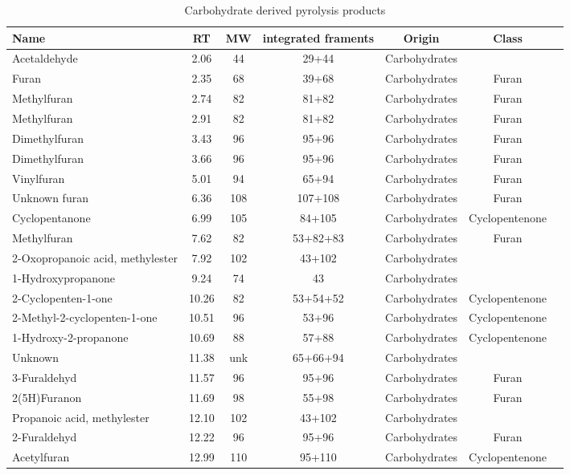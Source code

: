 \begin{table}[h!]
\begin{center}
\caption{Carbohydrate derived pyrolysis products}
\label{tab:chprod}
{\small
\begin{tabular}{lcccccc}
  \hline
Name & RT & MW & integrated framents & Origin & Class \\ 
  \hline
Acetaldehyde & 2.06 & 44 & 29+44 &Carbohydrates&  \\ 
Furan & 2.35 & 68 & 39+68 &Carbohydrates&Furan\\ 
Methylfuran & 2.74 & 82 & 81+82 &Carbohydrates&Furan\\ 
Methylfuran & 2.91 & 82 & 81+82 &Carbohydrates&Furan\\ 
Dimethylfuran & 3.43 & 96 & 95+96 &Carbohydrates&Furan\\ 
Dimethylfuran & 3.66 & 96 & 95+96 &Carbohydrates&Furan\\ 
Vinylfuran & 5.01 & 94 & 65+94 &Carbohydrates&Furan\\ 
Unknown furan & 6.36 & 108 & 107+108 &Carbohydrates&Furan\\ 
Cyclopentanone & 6.99 & 105 & 84+105 &Carbohydrates&Cyclopentenone\\ 
Methylfuran & 7.62 & 82 & 53+82+83 &Carbohydrates&Furan\\ 
2-Oxopropanoic acid, methylester & 7.92 & 102 & 43+102 &Carbohydrates& \\ 
1-Hydroxypropanone & 9.24 & 74 & 43 &Carbohydrates& \\ 
2-Cyclopenten-1-one & 10.26 & 82 & 53+54+52 &Carbohydrates&Cyclopentenone\\ 
2-Methyl-2-cyclopenten-1-one & 10.51 & 96 & 53+96 &Carbohydrates&Cyclopentenone\\ 
1-Hydroxy-2-propanone & 10.69 & 88 & 57+88 &Carbohydrates&Cyclopentenone\\ 
Unknown & 11.38 & unk & 65+66+94 &Carbohydrates& \\ 
3-Furaldehyd & 11.57 & 96 & 95+96 &Carbohydrates&Furan\\ 
2(5H)Furanon & 11.69 & 98 & 55+98 &Carbohydrates&Furan\\ 
Propanoic acid, methylester & 12.10 & 102 & 43+102 &Carbohydrates& \\ 
2-Furaldehyd & 12.22 & 96 & 95+96 &Carbohydrates&Furan\\ 
Acetylfuran & 12.99 & 110 & 95+110 &Carbohydrates&Cyclopentenone\\ 

\end{tabular}}
\end{center}
\end{table}
